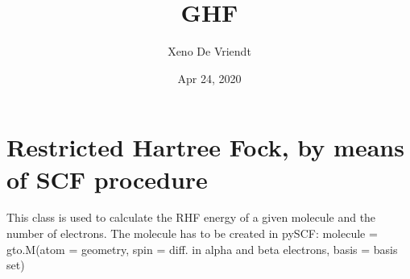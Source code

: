 \documentclass[letterpaper,10pt,english]{sphinxmanual}
\title{GHF}
\date{Apr 24, 2020}
\author{Xeno De Vriendt}
\begin{document}
\pagestyle{empty}
\sphinxmaketitle
\pagestyle{plain}
\sphinxtableofcontents
\pagestyle{normal}
\label{\detokenize{index::doc}}

\label{\detokenize{RHF:module-hf.HartreeFock.RHF}}

\chapter{Restricted Hartree Fock, by means of SCF procedure}
\label{\detokenize{RHF:restricted-hartree-fock-by-means-of-scf-procedure}}\label{\detokenize{RHF::doc}}
This class is used to calculate the RHF energy of a given molecule and the number of electrons.
The molecule has to be created in pySCF:
molecule = gto.M(atom = geometry, spin = diff. in alpha and beta electrons, basis = basis set)
\end{document}
